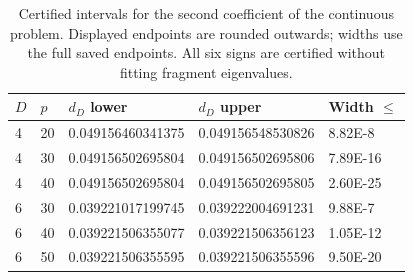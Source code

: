 \begin{table}[htbp]
\centering
\caption{Certified intervals for the second coefficient of the continuous problem. Displayed endpoints are rounded outwards; widths use the full saved endpoints. All six signs are certified without fitting fragment eigenvalues.}
\label{tab:signed_second}
\begin{tabular}{lllll}
\toprule
$D$ & $p$ & $d_D$ lower & $d_D$ upper & Width $\leq$ \\
\midrule
4 & 20 & 0.049156460341375 & 0.049156548530826 & 8.82E-8 \\
4 & 30 & 0.049156502695804 & 0.049156502695806 & 7.89E-16 \\
4 & 40 & 0.049156502695804 & 0.049156502695805 & 2.60E-25 \\
6 & 30 & 0.039221017199745 & 0.039222004691231 & 9.88E-7 \\
6 & 40 & 0.039221506355077 & 0.039221506356123 & 1.05E-12 \\
6 & 50 & 0.039221506355595 & 0.039221506355596 & 9.50E-20 \\
\bottomrule
\end{tabular}
\end{table}
